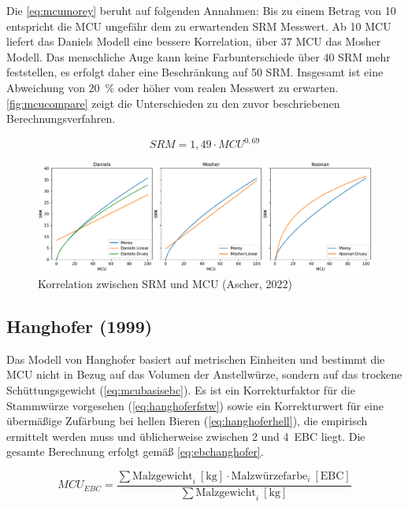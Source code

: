 \documentclass[a4paper,parskip=half]{scrartcl}
\newcommand{\MCUL}{\mathit{MCU}}
\newcommand{\MCUEBC}{\mathit{MCU}_{EBC}}
\newcommand{\SRM}{\mathit{SRM}}
\newcommand{\uebc}{\:[\textrm{EBC}]}
\newcommand{\ukg}{\:[\textrm{kg}]}
\begin{document}
Die \autoref{eq:mcumorey} beruht auf folgenden Annahmen: Bis zu einem Betrag von 10 entspricht die MCU ungefähr dem zu erwartenden SRM Messwert. Ab 10 MCU liefert das Daniels Modell eine bessere Korrelation, über 37 MCU das Mosher Modell. Das menschliche Auge kann keine Farbunterschiede über 40 SRM mehr feststellen, es erfolgt daher eine Beschränkung auf 50 SRM. Insgesamt ist eine Abweichung von 20~\% oder höher vom realen Messwert zu erwarten. \autoref{fig:mcucompare} zeigt die Unterschieden zu den zuvor beschriebenen Berechnungsverfahren. \parencite{Morey2004}

\begin{equation}
\SRM = 1,49 \cdot \MCUL^{0,69}
\label{eq:mcumorey}
\end{equation}

\begin{figure}[h]
\centering
\includegraphics[width=14cm]{graph_srm.pdf}
\caption{Korrelation zwischen SRM und MCU (Ascher, 2022)}
\label{fig:mcucompare}
\end{figure}

\subsection*{Hanghofer (1999)}

Das Modell von Hanghofer basiert auf metrischen Einheiten und bestimmt die MCU nicht in Bezug auf das Volumen der Anstellwürze, sondern auf das trockene Schüttungsgewicht (\autoref{eq:mcubasisebc}). Es ist ein Korrekturfaktor für die Stammwürze vorgesehen (\autoref{eq:hanghoferfstw}) sowie ein Korrekturwert für eine übermäßige Zufärbung bei hellen Bieren (\autoref{eq:hanghoferhell}), die empirisch ermittelt werden muss und üblicherweise zwischen 2 und 4~EBC liegt. Die gesamte Berechnung erfolgt gemäß \autoref{eq:ebchanghofer}. \parencite[76]{Hanghofer1999}

\begin{equation}
\MCUEBC = \frac{\sum \text{Malzgewicht}_i \ukg \cdot \text{Malzwürzefarbe}_i \uebc}{\sum \text{Malzgewicht}_i \ukg} 
\label{eq:mcubasisebc}
\end{equation}
\end{document}
